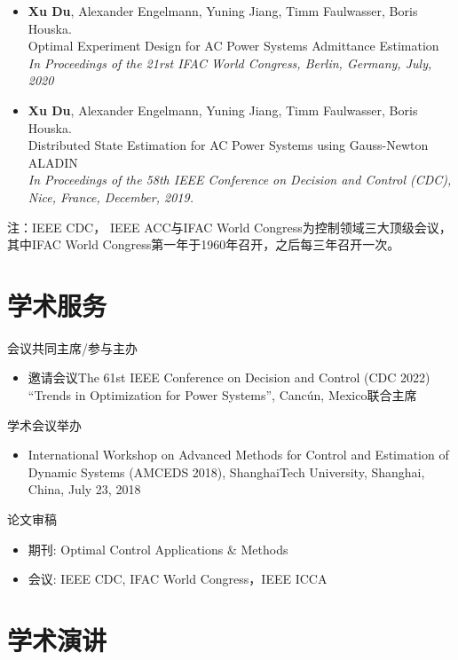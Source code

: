 \documentclass[paper=a4,fontsize=11pt]{scrartcl} %
\newcommand{\NewPart}[1]{\section*{\uppercase{#1}}}
\newcommand{\EducationEntry}[4]{
		\noindent \textbf{#1} \hfill      %
		\colorbox{White}{%
			\parbox{5cm}{%
			\hfill\color{Black}#2}} \par  %
		\noindent \textit{#3} \par        %
		\noindent\hangindent=2em\hangafter=0 \small #4 %
		\normalsize \par}
\begin{document}
\begin{CJK*}{UTF8}{gbsn}
\begin{itemize}
		\item  {\textbf{Xu Du}, Alexander Engelmann, Yuning Jiang, Timm Faulwasser, Boris Houska. \\
		Optimal Experiment Design for AC Power Systems Admittance Estimation\\
		\emph{In Proceedings of the 21rst IFAC World Congress, Berlin, Germany, July, 2020
		} }
	
	\item  {\textbf{Xu Du}, Alexander Engelmann, Yuning Jiang, Timm Faulwasser, Boris Houska. \\
		Distributed State Estimation for AC Power Systems using Gauss-Newton ALADIN \\
		 \emph{In Proceedings of the 58th IEEE Conference on Decision and Control (CDC),
		Nice, France, December, 2019.} }
\end{itemize}
注：IEEE CDC， IEEE ACC与IFAC World Congress为控制领域三大顶级会议，其中IFAC World Congress第一年于1960年召开，之后每三年召开一次。
\NewPart{学术服务}{会议共同主席/参与主办}
%
\begin{itemize}
	\item{邀请会议The 61st
		IEEE Conference on Decision and Control (CDC 2022)
		“Trends in Optimization for Power Systems”, Canc\'un, Mexico联合主席}
	\end{itemize}
{学术会议举办}
\begin{itemize}
\item{International Workshop on Advanced Methods for Control and Estimation of Dynamic
	Systems (AMCEDS 2018), ShanghaiTech University, Shanghai, China, July 23, 2018}
\end{itemize}
{论文审稿}
\begin{itemize}
	\item 期刊: Optimal Control Applications $\&$ Methods
	\item 会议: IEEE CDC, IFAC World Congress，IEEE ICCA
\end{itemize}

\NewPart{学术演讲}{}
\begin{itemize}
	

\end{itemize}
\end{CJK*}
\end{document}
